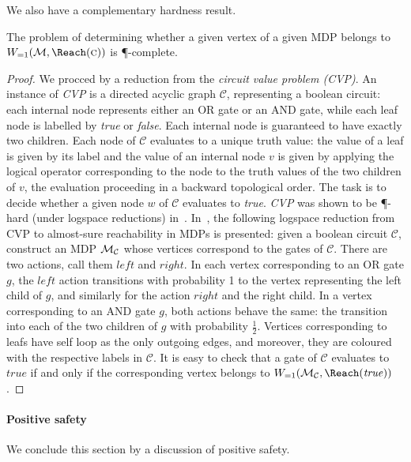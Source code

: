 We also have a complementary hardness result. 

\begin{theorem}
\label{5-thm:as-complexity}
The problem of determining whether a given vertex of a given MDP belongs to 
$\winAS(\mdp,\Reach(\genColour))$ is \P-complete.
\end{theorem}
\begin{proof}
	We procced by a reduction 
	from the \emph{circuit value problem (CVP)}.
	An instance of \emph{CVP} is a directed acyclic graph $\mathcal{C}$, 
	representing a boolean circuit: each internal node represents either an OR gate 
	or an AND gate, while each leaf node is labelled by \emph{true} or 
	\emph{false}. Each internal node is guaranteed to have exactly two children. 
	Each node of $\mathcal{C}$ evaluates to a unique truth value: the value of a 
	leaf is given by its label and the value of an internal node $v$ is given by 
	applying the logical operator corresponding to the node to the truth values of 
	the two children of $v$, the evaluation proceeding in a backward topological order. The task is to decide whether a given node $w$ of 
	$\mathcal{C}$ evaluates to \emph{true}. \emph{CVP} was shown to be 
	\P-hard (under logspace reductions) in~\cite{Ladner:1975}. 
	In~\cite{Chatterjee&Doyen&Henzinger:2010}, the following logspace reduction 
	from CVP to 
	almost-sure reachability in MDPs is presented: given a boolean circuit 
	$\mathcal{C}$, construct an MDP $\mathcal{M}_{\mathcal{C}}$ whose vertices correspond 
	to the gates 
	of $\mathcal{C}$. There are two actions, call them $\mathit{left}$ and $\mathit{right}$. In each vertex corresponding to an OR gate $g$, the 
	$\mathit{left}$ action transitions with probability 1 to the vertex 
	representing the left child of $g$, and similarly for the action 
	$\mathit{right}$ 
	and the right child. In a vertex corresponding to an AND gate $g$, both actions behave the same: the transition into each of the two children 
	of $g$ with probability $\frac{1}{2}$. Vertices corresponding to leafs have self loop as the only outgoing edges, and 
	moreover, they are coloured with the respective labels in $\mathcal{C}$. It is 
	easy to check that a gate of $\mathcal{C}$ evaluates to $\mathit{true}$ if and 
	only if the corresponding vertex belongs to 
	$\winAS(\mdp_{\mathcal{C}},\Reach(\mathit{true}))$.
\end{proof}

\paragraph{Positive safety} We conclude this section by a discussion of positive safety. 


